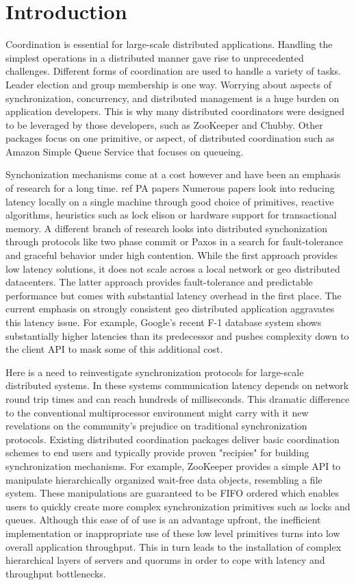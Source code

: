 \section{Introduction}\label{sec:intro}

Coordination is essential for large-scale distributed applications. Handling the simplest operations in a distributed manner gave rise to unprecedented challenges. Different forms of coordination are used to handle a variety of tasks. Leader election and group membership is one way. Worrying about aspects of synchronization, concurrency, and distributed management is a huge burden on application developers. This is why many distributed coordinators were designed to be leveraged by those developers, such as ZooKeeper and Chubby. Other packages focus on one primitive, or aspect, of distributed coordination such as Amazon Simple Queue Service that focuses on queueing. 

Synchonization mechanisms come at a cost however and have been an emphasis of research for a long time. {ref PA papers} Numerous papers look into reducing latency locally on a single machine through good choice of primitives, reactive algorithms, heuristics such as lock elison or hardware support for transactional memory. A different branch of research looks into distributed synchonization through protocols like two phase commit or Paxos in a search for fault-tolerance and graceful behavior under high contention. While the first approach provides low latency solutions, it does not scale across a local network or geo distributed datacenters. The latter approach provides fault-tolerance and predictable performance but comes with substantial latency overhead in the first place. The current emphasis on strongly consistent geo distributed application aggravates this latency issue. For example, Google's recent F-1 database system shows substantially higher latencies than its predecessor and pushes complexity down to the client API to mask some of this additional cost.

Here is a need to reinvestigate synchronization protocols for large-scale distributed systems. In these systems communication latency depends on network round trip times and can reach hundreds of milliseconds. This dramatic difference to the conventional multiprocessor environment might carry with it new revelations on the community's prejudice on traditional synchronization protocols. Existing distributed coordination packages deliver basic coordination schemes to end users and typically provide proven "recipies" for building synchronization mechanisms. For example, ZooKeeper provides a simple API to manipulate hierarchically organized wait-free data objects, resembling a file system. These manipulations are guaranteed to be FIFO ordered which enables users to quickly create more complex synchronization primitives such as locks and queues. Although this ease of of use is an advantage upfront, the inefficient implementation or inappropriate use of these low level primitives turns into low overall application throughput. This in turn leads to the installation of complex hierarchical layers of servers and quorums in order to cope with latency and throughput bottlenecks. 

